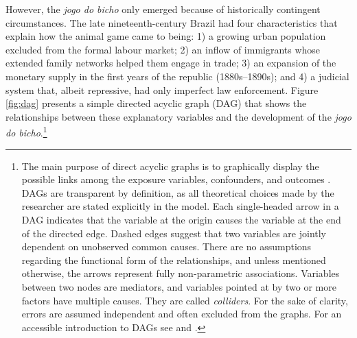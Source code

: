 However, the \emph{jogo do bicho} only emerged because of historically contingent circumstances. The late nineteenth-century Brazil had four characteristics that explain how the animal game came to being: 1) a growing urban population excluded from the formal labour market; 2) an inflow of immigrants whose extended family networks helped them engage in trade; 3) an expansion of the monetary supply in the first years of the republic (1880s--1890s); and 4) a judicial system that, albeit repressive, had only imperfect law enforcement. Figure \ref{fig:dag} presents a simple directed acyclic graph (DAG) \citep{pearl2009causality} that shows the relationships between these explanatory variables and the development of the \emph{jogo do bicho}.\footnote{The main purpose of direct acyclic graphs is to graphically display the possible links among the exposure variables, confounders, and outcomes \citep{morgan2014counterfactuals, pearl2009causality}. DAGs are transparent by definition, as all theoretical choices made by the researcher are stated explicitly in the model. Each single-headed arrow in a DAG indicates that the variable at the origin causes the variable at the end of the directed edge. Dashed edges suggest that two variables are jointly dependent on unobserved common causes. There are no assumptions regarding the functional form of the relationships, and unless mentioned otherwise, the arrows represent fully non-parametric associations. Variables between two nodes are mediators, and variables pointed at by two or more factors have multiple causes. They are called \emph{colliders}. For the sake of clarity, errors are assumed independent and often excluded from the graphs. For an accessible introduction to DAGs see \citet[chap. 3--4]{morgan2014counterfactuals} and \citet{pearl2016causal}.}

